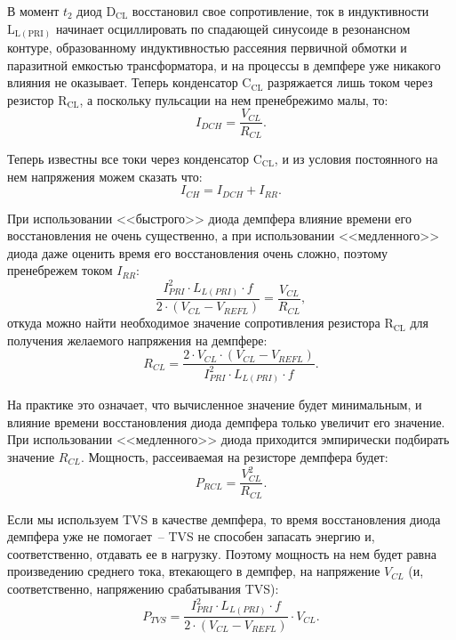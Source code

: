 В момент \( t_2 \) диод \( \mathrm{D_{CL}} \) восстановил свое сопротивление,
ток в индуктивности \( \mathrm{L_{L(PRI)}} \) начинает осциллировать по
спадающей синусоиде в резонансном контуре, образованному индуктивностью
рассеяния первичной обмотки и паразитной емкостью трансформатора, и на процессы
в демпфере уже никакого влияния не оказывает. Теперь конденсатор
\( \mathrm{C_{CL}} \) разряжается лишь током через резистор
\( \mathrm{R_{CL}} \), а поскольку пульсации на нем пренебрежимо малы, то:
\begin{equation}
	I_{DCH} = \frac{V_{CL}}{R_{CL}}.
\end{equation} 
 
Теперь известны все токи через конденсатор \( \mathrm{C_{CL}} \), и из условия
постоянного на нем напряжения можем сказать что:
\begin{equation}
	I_{CH} = I_{DCH} + I_{RR}.
\end{equation}
 
При использовании <<быстрого>> диода демпфера влияние времени его восстановления не 
очень существенно, а при использовании <<медленного>> диода даже оценить время его 
восстановления очень сложно, поэтому пренебрежем током \( I_{RR} \): 
\begin{equation}
	\frac{I_{PRI}^2\cdot L_{L(PRI)}\cdot f}{2\cdot (V_{CL} - V_{REFL})} =
	\frac{V_{CL}}{R_{CL}},
\end{equation}
откуда можно найти необходимое значение сопротивления резистора
\( \mathrm{R_{CL}} \) для получения желаемого напряжения на демпфере:
\begin{equation}
	R_{CL} = \frac{2\cdot V_{CL}\cdot (V_{CL} - V_{REFL})}
	{I_{PRI}^2\cdot L_{L(PRI)}\cdot f}.
\end{equation}
 
На практике это означает, что вычисленное значение будет минимальным, и влияние
времени восстановления диода демпфера только увеличит его значение. При
использовании <<медленного>> диода приходится эмпирически подбирать значение
\( R_{CL} \). Мощность, рассеиваемая на резисторе демпфера будет:
\begin{equation}
	P_{RCL} = \frac{V_{CL}^2}{R_{CL}}.
\end{equation}
 
Если мы используем TVS в качестве демпфера, то время восстановления диода
демпфера уже не помогает~-- TVS не способен запасать энергию и, соответственно,
отдавать ее в нагрузку. Поэтому мощность на нем будет равна произведению
среднего тока, втекающего в демпфер, на напряжение \( V_{CL} \) (и,
соответственно, напряжению срабатывания TVS):
\begin{equation}
	P_{TVS} = \frac{I_{PRI}^2\cdot L_{L(PRI)}\cdot f}{2\cdot(V_{CL} - V_{REFL})}
	\cdot V_{CL}.
\end{equation}

